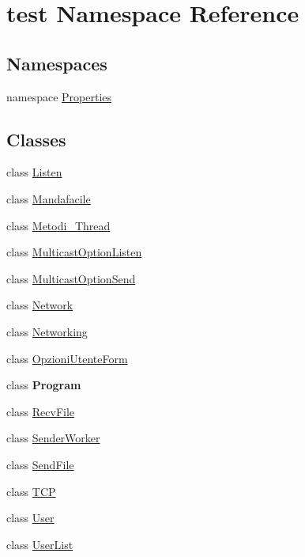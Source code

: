 \hypertarget{namespacetest}{}\section{test Namespace Reference}
\label{namespacetest}
\subsection*{Namespaces}
\begin{DoxyCompactItemize}
\item 
namespace \hyperlink{namespacetest_1_1_properties}{Properties}
\end{DoxyCompactItemize}
\subsection*{Classes}
\begin{DoxyCompactItemize}
\item 
class \hyperlink{classtest_1_1_listen}{Listen}
\item 
class \hyperlink{classtest_1_1_mandafacile}{Mandafacile}
\item 
class \hyperlink{classtest_1_1_metodi___thread}{Metodi\+\_\+\+Thread}
\item 
class \hyperlink{classtest_1_1_multicast_option_listen}{Multicast\+Option\+Listen}
\item 
class \hyperlink{classtest_1_1_multicast_option_send}{Multicast\+Option\+Send}
\item 
class \hyperlink{classtest_1_1_network}{Network}
\item 
class \hyperlink{classtest_1_1_networking}{Networking}
\item 
class \hyperlink{classtest_1_1_opzioni_utente_form}{Opzioni\+Utente\+Form}
\item 
class {\bfseries Program}
\item 
class \hyperlink{classtest_1_1_recv_file}{Recv\+File}
\item 
class \hyperlink{classtest_1_1_sender_worker}{Sender\+Worker}
\item 
class \hyperlink{classtest_1_1_send_file}{Send\+File}
\item 
class \hyperlink{classtest_1_1_t_c_p}{T\+CP}
\item 
class \hyperlink{classtest_1_1_user}{User}
\item 
class \hyperlink{classtest_1_1_user_list}{User\+List}
\end{DoxyCompactItemize}

